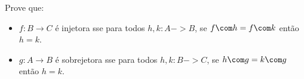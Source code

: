 \begin{exercise}
Prove que:
\begin{itemize}
    \item $f : B \to C$ é injetora sse para todos $h,k : A -> B$, se $f \com h = f \com k$ então $h = k$.
    \item $g : A \to B$ é sobrejetora sse para todos $h,k : B -> C$, se $h \com g = k \com g$ então $h = k$.
\end{itemize}
\end{exercise}
